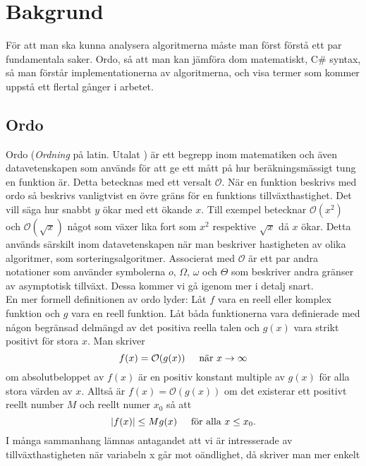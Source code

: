 \documentclass[a4, oneside]{report}
\begin{document}
\section{Bakgrund}
För att man ska kunna analysera algoritmerna måste man först förstå ett par fundamentala saker. Ordo, så att man kan jämföra dom matematiskt, C\# syntax, så man förstår implementationerna av algoritmerna, och visa termer som kommer uppstå ett flertal gånger i arbetet.
\subsection{Ordo}%
Ordo (\textit{Ordning} på latin. Utalat ) är ett begrepp inom matematiken och även datavetenskapen som används för att ge ett mått på hur beräkningsmässigt tung en funktion är. Detta betecknas med ett versalt $\mathcal{O}$. När en funktion beskrivs med ordo så beskrivs vanligtvist en övre gräns för en funktions tillväxthastighet. Det vill säga hur snabbt $y$ ökar med ett ökande $x$. Till exempel betecknar $\mathcal{O}(x^2)$ och $\mathcal{O}(\sqrt{x})$ något som växer lika fort som $x^2$ respektive $\sqrt{x}$ då $x$ ökar. Detta används särskilt inom datavetenskapen när man beskriver hastigheten av olika algoritmer, som sorteringsalgoritmer. \cite{4, 5} Associerat med $\mathcal{O}$ är ett par andra notationer som använder symbolerna $o$, $\Omega$, $\omega$ och $\Theta$ som beskriver andra gränser av asymptotisk tillväxt. Dessa kommer vi gå igenom mer i detalj snart.\\
En mer formell definitionen av ordo lyder: Låt $f$ vara en reell eller komplex funktion och $g$ vara en reell funktion. Låt båda funktionerna vara definierade med någon begränsad delmängd av det positiva reella talen och $g(x)$ vara strikt positivt för stora $x$. Man skriver \cite{6}
\begin{equation*}
    f(x)=\mathcal{O}(g(x))\hspace{5mm}\text{när }x\rightarrow\infty
\end{equation*}
om absolutbeloppet av $f(x)$ är en positiv konstant multiple av $g(x)$ för alla stora värden av $x$. Alltså är $f(x)=\mathcal{O}(g(x))$ om det existerar ett positivt reellt number $M$ och reellt numer $x_0$ så att
\begin{equation*}
    |f(x)|\leq Mg(x)\hspace{5mm}\text{för alla }x\leq x_0.
\end{equation*}
I många sammanhang lämnas antagandet att vi är intresserade av tillväxthastigheten när variabeln x går mot oändlighet, då skriver man mer enkelt
\end{document}
